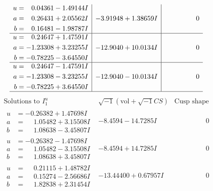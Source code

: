 \documentclass[1p]{elsarticle_modified}
\theoremstyle{definition}
\newcommand{\I}{\sqrt{-1}}
\begin{document}
$$\begin{array}{c|c|c}
\begin{aligned}
u &= \phantom{-}0.04361 - 1.49144 I \\
a &= \phantom{-}0.26431 + 2.05562 I \\
b &= \phantom{-}0.16481 - 1.98787 I\end{aligned}
 & -3.91948 + 1.38659 I & \phantom{-0.000000 } 0 \\ \hline\begin{aligned}
u &= \phantom{-}0.24647 + 1.47591 I \\
a &= -1.23308 + 3.23255 I \\
b &= -0.78225 - 3.64550 I\end{aligned}
 & -12.9040 + 10.0134 I & \phantom{-0.000000 } 0 \\ \hline\begin{aligned}
u &= \phantom{-}0.24647 - 1.47591 I \\
a &= -1.23308 - 3.23255 I \\
b &= -0.78225 + 3.64550 I\end{aligned}
 & -12.9040 - 10.0134 I & \phantom{-0.000000 } 0\\
 \hline 
 \end{array}$$\newpage$$\begin{array}{c|c|c}  
\text{Solutions to }I^u_{1}& \I (\text{vol} + \sqrt{-1}CS) & \text{Cusp shape}\\
 \hline 
\begin{aligned}
u &= -0.26382 + 1.47698 I \\
a &= \phantom{-}1.05482 + 3.15508 I \\
b &= \phantom{-}1.08638 - 3.45807 I\end{aligned}
 & -8.4594 - 14.7285 I & \phantom{-0.000000 } 0 \\ \hline\begin{aligned}
u &= -0.26382 - 1.47698 I \\
a &= \phantom{-}1.05482 - 3.15508 I \\
b &= \phantom{-}1.08638 + 3.45807 I\end{aligned}
 & -8.4594 + 14.7285 I & \phantom{-0.000000 } 0 \\ \hline\begin{aligned}
u &= \phantom{-}0.21115 + 1.48782 I \\
a &= \phantom{-}0.15274 - 2.56686 I \\
b &= \phantom{-}1.82838 + 2.31454 I\end{aligned}
 & -13.44400 + 0.67957 I & \phantom{-0.000000 } 0 \\ \hline\begin{aligned}

\end{aligned}
\end{array}$$
\end{document}
